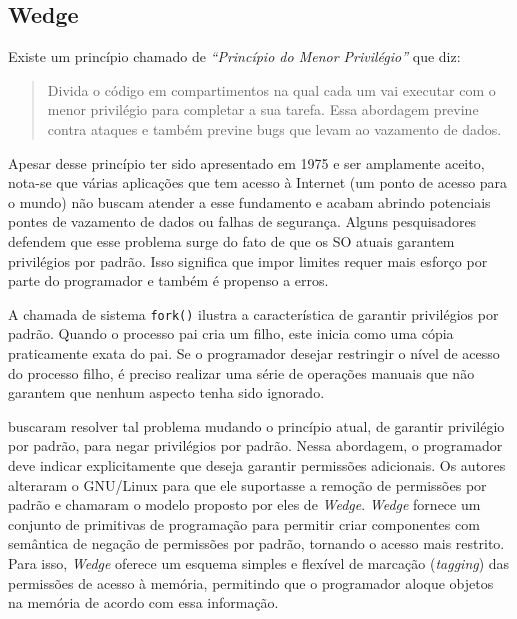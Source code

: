 \subsection{Wedge}

Existe um princípio chamado de \emph{``Princípio do Menor Privilégio''} que diz:

\begin{quote}
Divida o código em compartimentos na qual cada um vai executar com o menor
privilégio para completar a sua tarefa. Essa abordagem previne contra ataques
e também previne bugs que levam ao vazamento de dados.
\citep{protectionprinciple}
\end{quote}

Apesar desse princípio ter sido apresentado em 1975 e ser amplamente aceito,
nota-se que várias aplicações que tem acesso à Internet (um ponto de acesso
para o mundo) não buscam atender a esse fundamento e acabam abrindo
potenciais pontes de vazamento de dados ou falhas de segurança. Alguns
pesquisadores defendem que esse problema surge do fato de que os SO atuais
garantem privilégios por padrão. Isso significa que impor limites requer mais
esforço por parte do programador e também é propenso a erros.

A chamada de sistema \texttt{fork()} ilustra a característica de garantir
privilégios por padrão. Quando o processo pai cria um filho, este inicia como uma
cópia praticamente exata do pai. Se o programador desejar restringir o nível de
acesso do processo filho, é preciso realizar uma série de operações manuais que
não garantem que nenhum aspecto tenha sido ignorado.

\citet{wedge} buscaram resolver tal problema mudando o princípio atual, de
garantir privilégio por padrão, para negar privilégios por padrão. Nessa
abordagem, o programador deve indicar explicitamente que deseja garantir
permissões adicionais. Os autores alteraram o GNU/Linux para que ele
suportasse a remoção de permissões por padrão e chamaram o modelo proposto por
eles de \emph{Wedge}. \emph{Wedge} fornece um conjunto de primitivas de
programação para permitir criar componentes com semântica de negação de permissões
por padrão, tornando o acesso mais restrito. Para isso, \emph{Wedge} oferece
um esquema simples e flexível de marcação (\emph{tagging}) das permissões de
acesso à memória, permitindo que o programador aloque objetos na memória de
acordo com essa informação.

